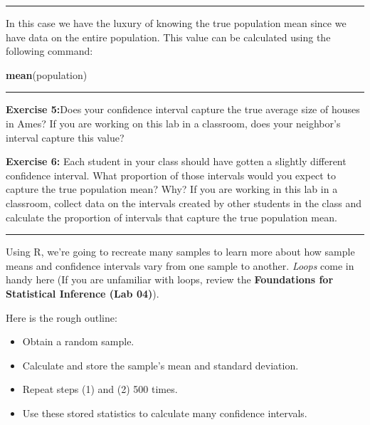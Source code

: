\documentclass[]{book}
\newenvironment{Shaded}{\begin{snugshade}}{\end{snugshade}}
\newcommand{\KeywordTok}[1]{\textcolor[rgb]{0.13,0.29,0.53}{\textbf{#1}}}
\newcommand{\NormalTok}[1]{#1}
\providecommand{\tightlist}{%
  \setlength{\itemsep}{0pt}\setlength{\parskip}{0pt}}
\theoremstyle{definition}
\theoremstyle{definition}
\theoremstyle{definition}
\theoremstyle{remark}
\begin{document}
\begin{center}\rule{0.5\linewidth}{\linethickness}\end{center}

In this case we have the luxury of knowing the true population mean
since we have data on the entire population. This value can be
calculated using the following command:

\begin{Shaded}
\begin{Highlighting}[]
\KeywordTok{mean}\NormalTok{(population)}
\end{Highlighting}
\end{Shaded}

\begin{center}\rule{0.5\linewidth}{\linethickness}\end{center}

\textbf{Exercise 5:}Does your confidence interval capture the true
average size of houses in Ames? If you are working on this lab in a
classroom, does your neighbor's interval capture this value?

\textbf{Exercise 6:} Each student in your class should have gotten a
slightly different confidence interval. What proportion of those
intervals would you expect to capture the true population mean? Why? If
you are working in this lab in a classroom, collect data on the
intervals created by other students in the class and calculate the
proportion of intervals that capture the true population mean.

\begin{center}\rule{0.5\linewidth}{\linethickness}\end{center}

Using R, we're going to recreate many samples to learn more about how
sample means and confidence intervals vary from one sample to another.
\emph{Loops} come in handy here (If you are unfamiliar with loops,
review the \textbf{Foundations for Statistical Inference (Lab 04)}).

Here is the rough outline:

\begin{itemize}
\tightlist
\item
  Obtain a random sample.
\item
  Calculate and store the sample's mean and standard deviation.
\item
  Repeat steps (1) and (2) 500 times.
\item
  Use these stored statistics to calculate many confidence intervals.
\end{itemize}
\end{document}
